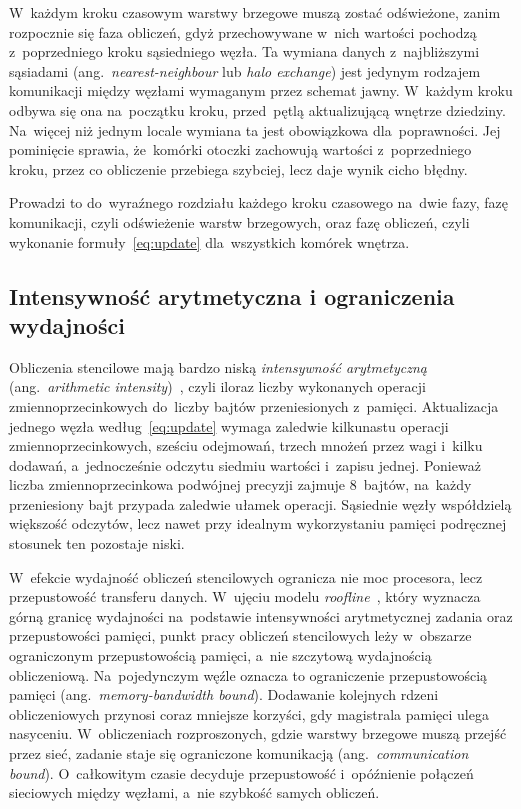 W~każdym kroku czasowym warstwy brzegowe muszą zostać odświeżone, zanim rozpocznie
się faza obliczeń, gdyż przechowywane w~nich wartości pochodzą z~poprzedniego
kroku sąsiedniego węzła. Ta wymiana danych z~najbliższymi sąsiadami
(ang.\ \emph{nearest-neighbour} lub \emph{halo exchange}) jest jedynym rodzajem
komunikacji między węzłami wymaganym przez schemat jawny. W~każdym kroku odbywa się ona
na~początku kroku, przed~pętlą aktualizującą wnętrze dziedziny. Na~więcej niż jednym locale wymiana ta jest obowiązkowa
dla~poprawności. Jej pominięcie sprawia, że~komórki otoczki zachowują wartości
z~poprzedniego kroku, przez co obliczenie przebiega szybciej, lecz daje wynik
cicho błędny.

Prowadzi to do~wyraźnego rozdziału każdego kroku czasowego na~dwie fazy,
fazę komunikacji, czyli odświeżenie warstw brzegowych, oraz fazę obliczeń, czyli wykonanie
formuły~\eqref{eq:update} dla~wszystkich komórek wnętrza.

\subsection{Intensywność arytmetyczna i ograniczenia wydajności}

Obliczenia stencilowe mają bardzo niską \emph{intensywność arytmetyczną}
(ang.\ \emph{arithmetic intensity})~\cite{datta-stencil}, czyli iloraz liczby
wykonanych operacji zmiennoprzecinkowych do~liczby bajtów przeniesionych z~pamięci.
Aktualizacja jednego węzła według~\eqref{eq:update}
wymaga zaledwie kilkunastu operacji zmiennoprzecinkowych, sześciu odejmowań, trzech
mnożeń przez wagi i~kilku dodawań, a~jednocześnie odczytu siedmiu wartości
i~zapisu jednej. Ponieważ liczba zmiennoprzecinkowa podwójnej precyzji zajmuje
\num{8}~bajtów, na~każdy przeniesiony
bajt przypada zaledwie ułamek operacji. Sąsiednie węzły
współdzielą większość odczytów, lecz nawet przy idealnym wykorzystaniu pamięci
podręcznej stosunek ten pozostaje niski.

W~efekcie wydajność obliczeń stencilowych ogranicza nie moc procesora,
lecz przepustowość transferu danych.
W~ujęciu modelu \emph{roofline}~\cite{roofline}, który wyznacza górną granicę wydajności
na~podstawie intensywności arytmetycznej zadania oraz przepustowości pamięci, punkt pracy
obliczeń stencilowych leży w~obszarze ograniczonym przepustowością pamięci, a~nie
szczytową wydajnością obliczeniową. Na~pojedynczym
węźle oznacza to ograniczenie przepustowością pamięci (ang.\ \emph{memory-bandwidth
bound}). Dodawanie kolejnych rdzeni obliczeniowych przynosi coraz mniejsze
korzyści, gdy magistrala pamięci ulega nasyceniu. W~obliczeniach rozproszonych,
gdzie warstwy brzegowe muszą przejść przez sieć, zadanie staje się ograniczone
komunikacją (ang.\ \emph{communication bound}). O~całkowitym czasie decyduje
przepustowość i~opóźnienie połączeń sieciowych między węzłami, a~nie szybkość
samych obliczeń.

